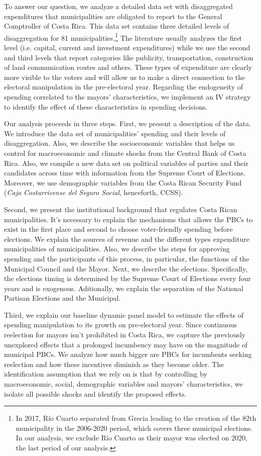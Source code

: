 To answer our question, we analyze a detailed data set with disaggregated expenditures that municipalities are obligated to report to the General Comptroller of Costa Rica. This data set contains three detailed levels of disaggregation for 81 municipalities.\footnote{In 2017, Río Cuarto separated from Grecia leading to the creation of the 82th municipality in the 2006-2020 period, which covers three municipal elections. In our analysis, we exclude Río Cuarto as their mayor was elected on 2020, the last period of our analysis. }  The literature usually analyzes the first level (i.e. capital, current and investment expenditures) while we use the second and third levels that report categories like publicity, transportation, construction of land communication routes and others. These types of expenditure are clearly more visible to the voters and will allow us to make a direct connection to the electoral manipulation in the pre-electoral year. Regarding the endogeneity of spending correlated to the mayors' characteristics, we implement an IV strategy to identify the effect of these characteristics in spending decisions. 

Our analysis proceeds in three steps. First, we present a description of the data. We introduce the data set of municipalities' spending and their levels of disaggregation. Also, we describe the socioeconomic variables that helps us control for macroeconomic and climate shocks from the Central Bank of Costa Rica. Also, we compile a new data set on political variables of parties and their candidates across time with information from the Supreme Court of Elections. Moreover, we use demographic variables from the Costa Rican Security Fund (\textit{Caja Costarricense del Seguro Social}, henceforth, CCSS). 

Second, we present the institutional background that regulates Costa Rican municipalities. It's necessary to explain the mechanisms that allows the PBCs to exist in the first place and second to choose voter-friendly spending before elections. We explain the sources of revenue and the different types expenditure municipalities of municipalities. Also, we describe the steps for approving spending and the participants of this process, in particular, the functions of the Municipal Council and the Mayor. Next, we describe the elections. Specifically, the elections timing is determined by the Supreme Court of Elections every four years and is exogenous. Aditionally, we explain the separation of the National Partisan Elections and the Municipal.  

Third, we explain our baseline dynamic panel model to estimate the effects of spending manipulation to its growth on pre-electoral year. Since continuous reelection for mayors isn't prohibited in Costa Rica, we capture the previously unexplored effects that a prolonged incumbency may have on the magnitude of municipal PBCs. We analyze how much bigger are PBCs for incumbents seeking reelection and how these incentives diminish as they become older. The identification assumption that we rely on is that by controlling by macroeconomic, social, demographic variables and mayors' characteristics, we isolate all possible shocks and identify the proposed effects. 
